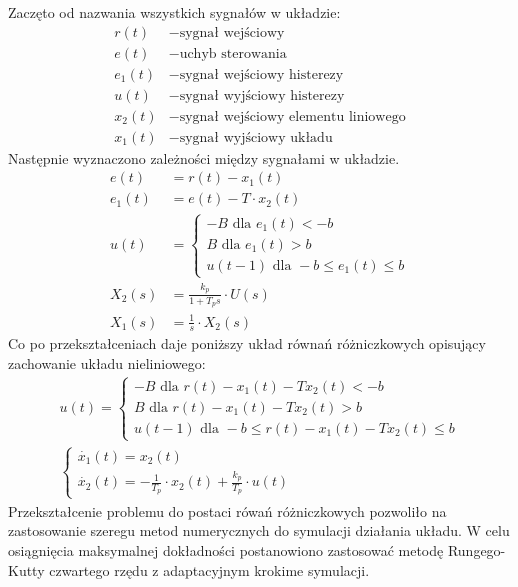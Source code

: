 \documentclass[a4paper]{article}
\begin{document}
Zaczęto od nazwania wszystkich sygnałów w układzie: \\
\begin{align*}
    r(t) &- \text{sygnał wejściowy}\\
    e(t) &- \text{uchyb sterowania}\\
    e_1(t) &- \text{sygnał wejściowy histerezy}\\
    u(t) &- \text{sygnał wyjściowy histerezy}\\
    x_2(t) &- \text{sygnał wejściowy elementu liniowego}\\
    x_1(t) &- \text{sygnał wyjściowy układu}
\end{align*}
Następnie wyznaczono zależności między sygnałami w układzie.
\begin{align*}
    e(t) &= r(t) - x_1(t) \\
    e_1(t) &= e(t) - T \cdot x_2(t) \\
    u(t) &= \begin{cases}
        -B \text{ dla } e_1(t) < -b \\
        B \text{ dla } e_1(t) > b \\
        u(t-1) \text{ dla } -b \leq e_1(t) \leq b
    \end{cases}\\
    X_2(s) &= \frac{k_p}{1+T_ps} \cdot U(s) \\
    X_1(s) &= \frac{1}{s} \cdot X_2(s)
\end{align*}
Co po przekształceniach daje poniższy układ równań różniczkowych opisujący zachowanie układu nieliniowego:
\begin{gather*}
    u(t) = \begin{cases}
        -B \text{ dla } r(t) - x_1(t) - Tx_2(t) < -b \\
        B \text{ dla } r(t) - x_1(t) - Tx_2(t) > b \\
        u(t-1) \text{ dla } -b \leq r(t) - x_1(t) - Tx_2(t) \leq b
    \end{cases} \\
    \begin{cases}
        \dot{x_1}(t) = x_2(t) \\
        \dot{x_2}(t) = -\frac{1}{T_p} \cdot x_2(t) + \frac{k_p}{T_p} \cdot u(t)
    \end{cases}
\end{gather*}
Przekształcenie problemu do postaci rówań różniczkowych pozwoliło na zastosowanie szeregu metod numerycznych do symulacji działania układu.
W celu osiągnięcia maksymalnej dokładności postanowiono zastosować metodę Rungego-Kutty czwartego rzędu z adaptacyjnym krokime symulacji.
\end{document}
